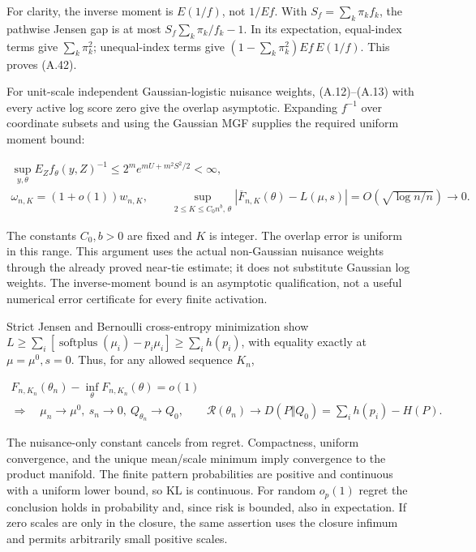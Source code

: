 \documentclass{article}
\begin{document}
For clarity, the inverse moment is \(E(1/f)\), not \(1/Ef\). With
\(S_f=\sum_k\pi_k f_k\), the pathwise Jensen gap is at most
\(S_f\sum_k\pi_k/f_k-1\). In its expectation, equal-index terms give
\(\sum_k\pi_k^2\); unequal-index terms give
\((1-\sum_k\pi_k^2)Ef\,E(1/f)\). This proves (A.42).

For unit-scale independent Gaussian-logistic nuisance weights,
(A.12)--(A.13) with every active log score zero give the overlap
asymptotic. Expanding \(f^{-1}\) over coordinate subsets and using the
Gaussian MGF supplies the required uniform moment bound:

\[
\begin{gathered}
\sup_{y,\theta}E_Zf_\theta(y,Z)^{-1}\le2^m e^{mU+m^2S^2/2}<\infty,\\
\omega_{n,K}=(1+o(1))w_{n,K},\qquad
\sup_{2\le K\le C_0n^b,\,\theta}|\overline F_{n,K}(\theta)-L(\mu,s)|
=O\!\left(\sqrt{\log n/n}\right)\to0 .
\end{gathered}
\tag{A.43}
\]

The constants \(C_0,b>0\) are fixed and \(K\) is integer. The overlap
error is uniform in this range. This argument uses the actual
non-Gaussian nuisance weights through the already proved near-tie
estimate; it does not substitute Gaussian log weights. The
inverse-moment bound is an asymptotic qualification, not a useful
numerical error certificate for every finite activation.

Strict Jensen and Bernoulli cross-entropy minimization show
\(L\ge\sum_i[\operatorname{softplus}(\mu_i)-p_i\mu_i]\ge\sum_i h(p_i)\),
with equality exactly at \(\mu=\mu^0,s=0\). Thus, for any allowed
sequence \(K_n\),

\[
\begin{gathered}
F_{n,K_n}(\theta_n)-\inf_\theta F_{n,K_n}(\theta)=o(1)\\
\Longrightarrow\quad\mu_n\to\mu^0,\ s_n\to0,\ Q_{\theta_n}\to Q_0,\qquad
\mathcal R(\theta_n)\to D(P\Vert Q_0)=\sum_i h(p_i)-H(P).
\end{gathered}
\tag{A.44}
\]

The nuisance-only constant cancels from regret. Compactness, uniform
convergence, and the unique mean/scale minimum imply convergence to the
product manifold. The finite pattern probabilities are positive and
continuous with a uniform lower bound, so KL is continuous. For random
\(o_p(1)\) regret the conclusion holds in probability and, since risk is
bounded, also in expectation. If zero scales are only in the closure,
the same assertion uses the closure infimum and permits arbitrarily
small positive scales.
\end{document}
